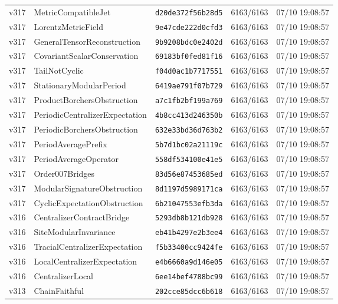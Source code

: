 \documentclass[11pt]{article}
\theoremstyle{definition}\newtheorem{deriv}{Derivação}
\begin{document}
{\begin{longtable}{@{}lllll@{}}
v317 & MetricCompatibleJet & \texttt{d20de372f56b28d5} & 6163/6163 & 07/10 19:08:57 \\
v317 & LorentzMetricField & \texttt{9e47cde222d0cfd3} & 6163/6163 & 07/10 19:08:57 \\
v317 & GeneralTensorReconstruction & \texttt{9b9208bdc0e2402d} & 6163/6163 & 07/10 19:08:57 \\
v317 & CovariantScalarConservation & \texttt{69183bf0fed81f16} & 6163/6163 & 07/10 19:08:57 \\
v317 & TailNotCyclic & \texttt{f04d0ac1b7717551} & 6163/6163 & 07/10 19:08:57 \\
v317 & StationaryModularPeriod & \texttt{6419ae791f07b729} & 6163/6163 & 07/10 19:08:57 \\
v317 & ProductBorchersObstruction & \texttt{a7c1fb2bf199a769} & 6163/6163 & 07/10 19:08:57 \\
v317 & PeriodicCentralizerExpectation & \texttt{4b8cc413d246350b} & 6163/6163 & 07/10 19:08:57 \\
v317 & PeriodicBorchersObstruction & \texttt{632e33bd36d763b2} & 6163/6163 & 07/10 19:08:57 \\
v317 & PeriodAveragePrefix & \texttt{5b7d1bc02a21119c} & 6163/6163 & 07/10 19:08:57 \\
v317 & PeriodAverageOperator & \texttt{558df534100e41e5} & 6163/6163 & 07/10 19:08:57 \\
v317 & Order007Bridges & \texttt{83d56e87453685ed} & 6163/6163 & 07/10 19:08:57 \\
v317 & ModularSignatureObstruction & \texttt{8d1197d5989171ca} & 6163/6163 & 07/10 19:08:57 \\
v317 & CyclicExpectationObstruction & \texttt{6b21047553efb3da} & 6163/6163 & 07/10 19:08:57 \\
v316 & CentralizerContractBridge & \texttt{5293db8b121db928} & 6163/6163 & 07/10 19:08:57 \\
v316 & SiteModularInvariance & \texttt{eb41b4297e2b3ee4} & 6163/6163 & 07/10 19:08:57 \\
v316 & TracialCentralizerExpectation & \texttt{f5b33400cc9424fe} & 6163/6163 & 07/10 19:08:57 \\
v316 & LocalCentralizerExpectation & \texttt{e4b6660a9d146e05} & 6163/6163 & 07/10 19:08:57 \\
v316 & CentralizerLocal & \texttt{6ee14bef4788bc99} & 6163/6163 & 07/10 19:08:57 \\
v313 & ChainFaithful & \texttt{202cce85dcc6b618} & 6163/6163 & 07/10 19:08:57 \\

\end{longtable}}
\end{document}

